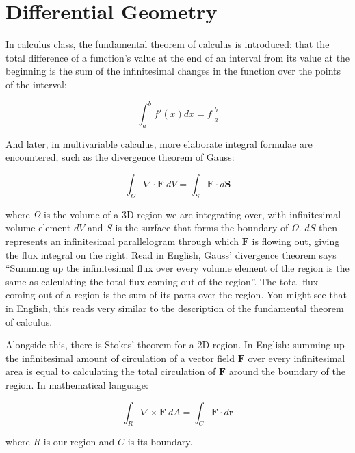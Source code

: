 \documentclass[../master.tex]{subfiles}
\begin{document}
\chapter{Differential Geometry}\label{ch:diffgeo}\thispagestyle{empty}

In calculus class, the fundamental theorem of calculus is introduced: that the total difference of a function's value at the end of an interval from its value at the beginning is the sum of the infinitesimal changes in the function over the points of the interval:

	\begin{equation}\label{eq:FTOC}
		\int_a^b f'(x) dx = f\Big\rvert^b_a
	\end{equation}

And later, in multivariable calculus, more elaborate integral formulae are encountered, such as the divergence theorem of Gauss:

	\begin{equation}\label{eq:Divergence}
		\int_\Omega \nabla \cdot \mathbf{F} ~ dV = \int_S \mathbf{F} \cdot d\mathbf S
	\end{equation}

	where $\Omega$ is the volume of a 3D region we are integrating over, with infinitesimal volume element $dV$ and $S$ is the surface that forms the boundary of $\Omega$. $dS$ then represents an infinitesimal parallelogram through which $\mathbf{F}$ is flowing out, giving the flux integral on the right. Read in English, Gauss' divergence theorem says ``Summing up the infinitesimal flux over every volume element of the region is the same as calculating the total flux coming out of the region''. The total flux coming out of a region is the sum of its parts over the region. You might see that in English, this reads very similar to the description of the fundamental theorem of calculus.
	
	Alongside this, there is Stokes' theorem for a 2D region. In English: summing up the infinitesimal amount of circulation of a vector field $\mathbf F$ over every infinitesimal area is equal to calculating the total circulation of $\mathbf F$ around the boundary of the region. In mathematical language:
	
	\begin{equation}\label{eq:Stokes}
		\int_R \nabla \times \mathbf{F} ~ dA = \int_C \mathbf{F} \cdot d\mathbf r
	\end{equation}
	
	where $R$ is our region and $C$ is its boundary.
	
\end{document}
